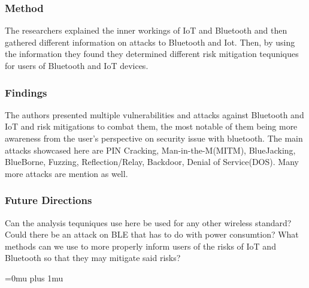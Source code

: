 \subsubsection{Method}

\noindent
The researchers explained the inner workings of IoT and Bluetooth and then gathered different information on attacks to Bluetooth and Iot. Then, by using the information they found they determined different risk mitigation tequniques for users of Bluetooth and IoT devices.

\subsubsection{Findings}

\noindent
The authors presented multiple vulnerabilities and attacks against Bluetooth and IoT and risk mitigations to combat them, the most notable of them being more awareness from the user's perspective on security issue with bluetooth. The main attacks showcased here are PIN Cracking, Man-in-the-M(MITM), BlueJacking, BlueBorne, Fuzzing, Reflection/Relay, Backdoor, Denial of Service(DOS). Many more attacks are mention as well.

\subsubsection{Future Directions}

\noindent
Can the analysis tequniques use here be used for any other wireless standard? Could there be an attack on BLE that has to do with power consumtion? What methods can we use to more properly inform users of the risks of IoT and Bluetooth so that they may mitigate said risks?

\Urlmuskip=0mu plus 1mu\relax

\pagebreak

